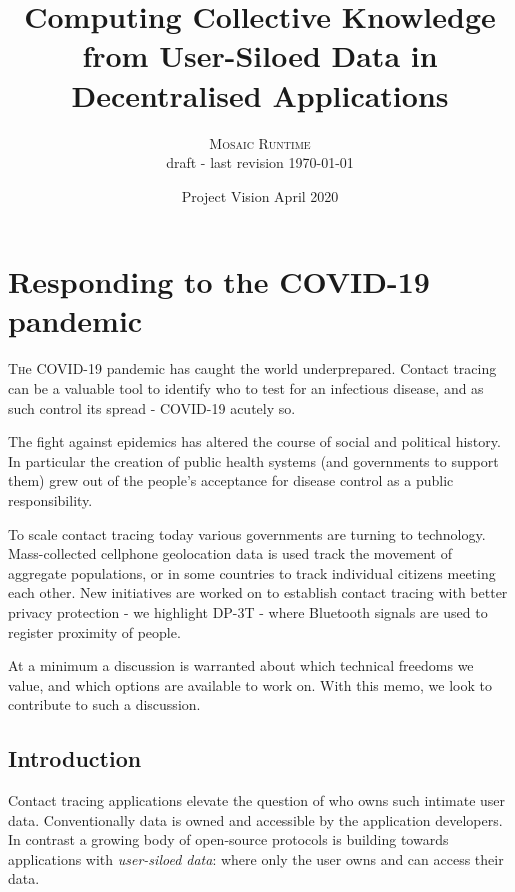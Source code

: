 \documentclass[twoside,twocolumn]{article}
\title{Computing Collective Knowledge from User-Siloed Data in Decentralised Applications} %
\author{%
\textsc{Mosaic Runtime} \\[1ex]
\normalsize draft - last revision \today
}
\date{Project Vision April 2020} %
\begin{document}
\maketitle


\section{Responding to the COVID-19 pandemic}

\lettrine[nindent=0em,lines=3]{T} he COVID-19 pandemic has caught the world underprepared. Contact tracing can be a valuable tool to identify who to test for an infectious disease, and as such control its spread - COVID-19 acutely so.

The fight against epidemics has altered the course of social and political history. In particular the creation of public health systems (and governments to support them) grew out of the people's acceptance for disease control as a public responsibility.

To scale contact tracing today various governments are turning to technology. Mass-collected cellphone geolocation data is used track the movement of aggregate populations, or in some countries to track individual citizens meeting each other.
New initiatives are worked on to establish contact tracing with better privacy protection - we highlight DP-3T - where Bluetooth signals are used to register proximity of people.

At a minimum a discussion is warranted about which technical freedoms we value, and which options are available to work on. With this memo, we look to contribute to such a discussion.


\subsection{Introduction}
Contact tracing applications elevate the question of who owns such intimate user data. Conventionally data is owned and accessible by the application developers. In contrast a growing body of open-source protocols is building towards applications with \emph{user-siloed data}: where only the user owns and can access their data.
\end{document}
